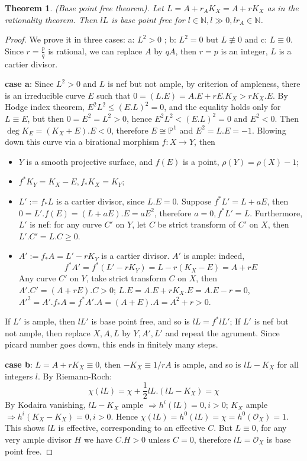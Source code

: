 \documentclass{article}
\newtheorem{thm}[defn]{Theorem}
\begin{document}
\begin{thm}
  (Base point free theorem). Let $ L=A+r_AK_X=A+rK_X $ as in the rationality theorem. Then $ lL $ is base point free for $ l\in\mathbb{N}, l\gg 0, lr_A\in \mathbb{N} $.
\end{thm}
\begin{proof}
  We prove it in three cases: a: $  L^2>0$ ; b: $ L^2=0$ but $ L\not\equiv 0 $ and c: $ L\equiv0 $. Since $ r=\frac{p}{q} $ is rational, we can replace $ A $ by $ qA $, then $ r=p $ is an integer, $ L $ is a cartier divisor.

  \textbf{case a}: Since $ L^2>0 $ and $ L $ is nef but not ample, by criterion of ampleness, there is an irreducible curve $ E $ such that $ 0=(L.E)=A.E+rE.K_X>rK_X.E $. By Hodge index theorem, $ E^2L^2\leqslant (E.L)^2=0 $, and the equality holds only for $ L\equiv E $, but then $ 0=E^2=L^2>0 $,   hence $ E^2L^2< (E.L)^2=0 $ and $ E^2<0 $. Then $ \deg K_E =(K_X+E).E<0 $, therefore $ E\cong \mathbb{P}^1 $ and $ E^2=L.E=-1 $. Blowing down this curve via a birational morphism $ f:X\to Y $, then
  \begin{itemize}
    \item $ Y $ is a smooth projective surface, and $ f(E) $ is a point, $ \rho (Y)=\rho(X)-1 $;
    \item $ f^*K_Y=K_X-E, f_*K_X=K_Y $;
    \item $ L':=f_*L $ is a cartier divisor, since $ L.E=0 $. Suppose $ f^*L'=L +aE $, then $ 0=L'.f(E)=(L+aE).E=aE^2 $, therefore $ a=0,f^*L'=L $. Furthermore, $ L'  $ is nef: for any curve $ C' $ on $ Y $, let $ C $ be strict transform of $ C' $ on $ X $, then $ L'.C'=L.C\geqslant0 $.
    \item $ A':=f_*A=L'-rK_Y $ is a cartier divisor. $ A' $ is ample: indeed,
          \[ f^*A'=f^*(L'-rK_Y)=L-r(K_X-E)=A+rE \]
          Any curve $ C' $ on $ Y $, take strict transform $ C $ on $ X $, then $ A'.C'=(A+rE).C>0 $; $ L.E=A.E+rK_X.E=A.E-r=0 $, $ A'^2=A'.f_*A=f^*A'.A=(A+E).A=A^2+r>0 $.
  \end{itemize}
  If $ L' $ is ample, then $ lL' $ is base point free, and so is $ lL=f^*lL' $; If $ L' $ is nef but not ample, then replace $ X,A,L $ by $ Y,A',L' $ and repeat the agrument. Since picard number goes down, this ends in finitely many steps.

  \textbf{case b}: $ L=A+rK_X\equiv 0 $, then $ -K_X\equiv 1/rA $ is ample, and so is $ lL-K_X $ for all integers $ l $. By Riemann-Roch:
  \[ \chi (lL)=\chi+\frac{1}{2}lL.(lL-K_X)=\chi \]
  By Kodaira vanishing, $ lL-K_X $ ample $ \Rightarrow h^i(lL)=0,i>0$; $ K_X $ ample $ \Rightarrow h^i(K_X-K_X)=0,i>0$. Hence $ \chi(lL)=h^0(lL)=\chi=h^0(\mathcal{O}_X)=1 $. This shows $ lL $ is effective, corresponding to an effective $ C $. But $ L\equiv 0 $, for any very ample divisor $ H $ we have $ C.H>0 $ unless $ C=0 $, therefore $ lL=\mathcal{O}_X $ is base point free.


\end{proof}
\end{document}
